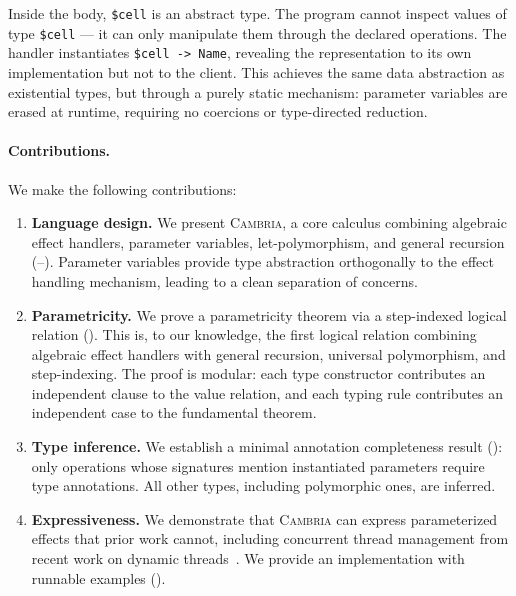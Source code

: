 \documentclass[acmsmall,screen,review,anonymous]{acmart}
\newcommand{\cambria}{\textsc{Cambria}}
\begin{document}
Inside the body, \lstinline{$cell} is an abstract type. The program cannot inspect values of type \lstinline{$cell} --- it can only manipulate them through the declared operations. The handler instantiates \lstinline{$cell -> Name}, revealing the representation to its own implementation but not to the client. This achieves the same data abstraction as existential types, but through a purely static mechanism: parameter variables are erased at runtime, requiring no coercions or type-directed reduction.

\paragraph{Contributions.} We make the following contributions:
\begin{enumerate}[leftmargin=*]
  \item \textbf{Language design.} We present \cambria{}, a core calculus combining algebraic effect handlers, parameter variables, let-polymorphism, and general recursion (--). Parameter variables provide type abstraction orthogonally to the effect handling mechanism, leading to a clean separation of concerns.

  \item \textbf{Parametricity.} We prove a parametricity theorem via a step-indexed logical relation (). This is, to our knowledge, the first logical relation combining algebraic effect handlers with general recursion, universal polymorphism, and step-indexing. The proof is modular: each type constructor contributes an independent clause to the value relation, and each typing rule contributes an independent case to the fundamental theorem.

  \item \textbf{Type inference.} We establish a minimal annotation completeness result (): only operations whose signatures mention instantiated parameters require type annotations. All other types, including polymorphic ones, are inferred.

  \item \textbf{Expressiveness.} We demonstrate that \cambria{} can express parameterized effects that prior work cannot, including concurrent thread management from recent work on dynamic threads~\cite{kammar2025equational}. We provide an implementation with runnable examples ().
\end{enumerate}
\end{document}
